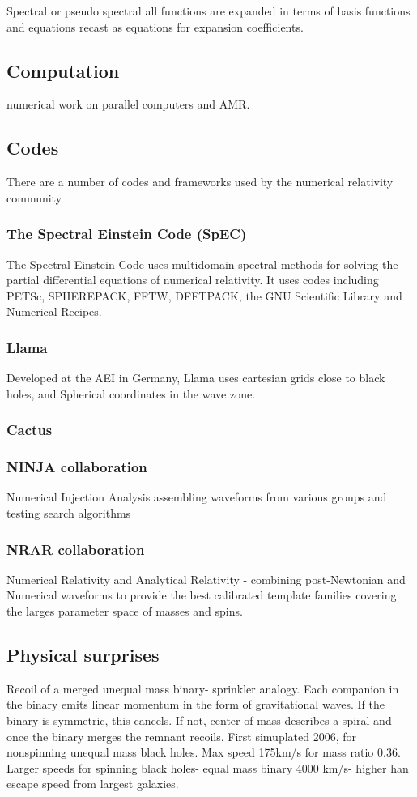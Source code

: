 \documentclass{article}
\begin{document}
Spectral or pseudo spectral all functions are expanded in terms of basis functions and equations recast as equations for expansion coefficients.
 
\subsection{Computation}
numerical work on parallel computers and AMR.

\subsection{Codes}
There are a number of codes and frameworks used by the numerical relativity community
\subsubsection{The Spectral Einstein Code (SpEC)}
The Spectral Einstein Code uses multidomain spectral methods for solving the partial differential equations of numerical relativity. It uses codes including PETSc, SPHEREPACK, FFTW, DFFTPACK, the GNU Scientific Library and Numerical Recipes.

\subsubsection{Llama}
Developed at the AEI in Germany, Llama uses cartesian grids close to black holes, and Spherical coordinates in the wave zone.

\subsubsection{Cactus}

\subsubsection{NINJA collaboration}
Numerical Injection Analysis assembling waveforms from various groups and testing search algorithms

\subsubsection{NRAR collaboration}
Numerical Relativity and Analytical Relativity - combining post-Newtonian and Numerical waveforms to provide the best calibrated template families covering the larges parameter space of masses and spins.

\subsection{Physical surprises}
Recoil of a merged unequal mass binary- sprinkler analogy. Each companion in the binary emits linear momentum in the form of gravitational waves. If the binary is symmetric, this cancels. If not, center of mass describes a spiral and once the binary merges the remnant recoils. First simuplated 2006,  for nonspinning unequal mass black holes. Max speed 175km/s for mass ratio 0.36. Larger speeds for spinning black holes- equal mass binary 4000 km/s- higher han escape speed from largest galaxies.
\end{document}
